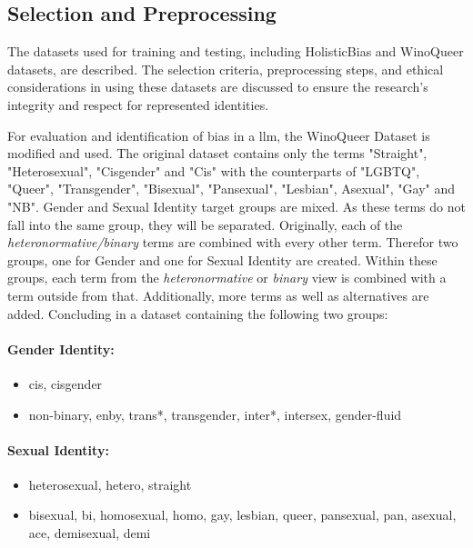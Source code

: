 \subsection{Selection and Preprocessing}

\textcolor{bhtBlue}{The datasets used for training and testing, including HolisticBias and WinoQueer datasets, are described. The selection criteria, preprocessing steps, and ethical considerations in using these datasets are discussed to ensure the research's integrity and respect for represented identities.}

For evaluation and identification of bias in a \acrshort{llm}, the WinoQueer \citep{winoqueer} Dataset is modified and used. The original dataset contains only the terms "Straight", "Heterosexual", "Cisgender" and "Cis" with the counterparts of "LGBTQ", "Queer", "Transgender", "Bisexual", "Pansexual", "Lesbian", Asexual", "Gay" and "NB". Gender and Sexual Identity target groups are mixed. As these terms do not fall into the same group, they will be separated. Originally, each of the \textit{heteronormative/binary} terms are combined with every other term. 
Therefor two groups, one for Gender and one for Sexual Identity are created. Within these groups, each term from the \textit{heteronormative} or \textit{binary} view is combined with a term outside from that.
Additionally, more terms as well as alternatives are added. Concluding in a dataset containing the following two groups:  

\paragraph{Gender Identity:}
\begin{itemize}
    \item cis, cisgender
    \item non-binary, enby, trans*, transgender, inter*, intersex, gender-fluid
\end{itemize}

\paragraph{Sexual Identity:}
\begin{itemize}
    \item heterosexual, hetero, straight
    \item bisexual, bi, homosexual, homo, gay, lesbian, queer, pansexual, pan, asexual, ace, demisexual, demi
\end{itemize}


